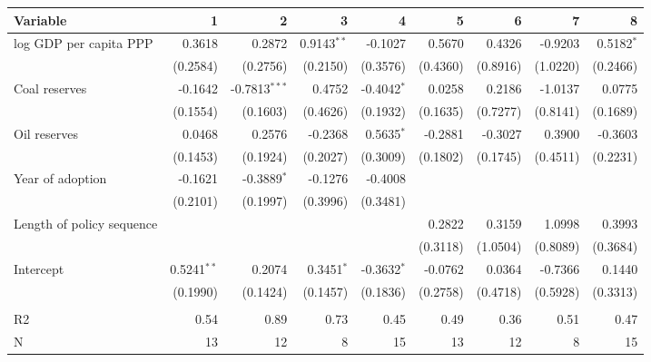 \begin{tabular}{lrrrrrrrr}
\toprule
                  Variable &               1 &                  2 &               3 &              4 &         5 &         6 &         7 &             8 \\
\midrule
    log GDP per capita PPP &          0.3618 &             0.2872 &  0.9143$^{* *}$ &        -0.1027 &    0.5670 &    0.4326 &   -0.9203 &  0.5182$^{*}$ \\
                           &        (0.2584) &           (0.2756) &        (0.2150) &       (0.3576) &  (0.4360) &  (0.8916) &  (1.0220) &      (0.2466) \\
             Coal reserves &         -0.1642 &  -0.7813$^{* * *}$ &          0.4752 &  -0.4042$^{*}$ &    0.0258 &    0.2186 &   -1.0137 &        0.0775 \\
                           &        (0.1554) &           (0.1603) &        (0.4626) &       (0.1932) &  (0.1635) &  (0.7277) &  (0.8141) &      (0.1689) \\
              Oil reserves &          0.0468 &             0.2576 &         -0.2368 &   0.5635$^{*}$ &   -0.2881 &   -0.3027 &    0.3900 &       -0.3603 \\
                           &        (0.1453) &           (0.1924) &        (0.2027) &       (0.3009) &  (0.1802) &  (0.1745) &  (0.4511) &      (0.2231) \\
          Year of adoption &         -0.1621 &      -0.3889$^{*}$ &         -0.1276 &        -0.4008 &           &           &           &               \\
                           &        (0.2101) &           (0.1997) &        (0.3996) &       (0.3481) &           &           &           &               \\
 Length of policy sequence &                 &                    &                 &                &    0.2822 &    0.3159 &    1.0998 &        0.3993 \\
                           &                 &                    &                 &                &  (0.3118) &  (1.0504) &  (0.8089) &      (0.3684) \\
                 Intercept &  0.5241$^{* *}$ &             0.2074 &    0.3451$^{*}$ &  -0.3632$^{*}$ &   -0.0762 &    0.0364 &   -0.7366 &        0.1440 \\
                           &        (0.1990) &           (0.1424) &        (0.1457) &       (0.1836) &  (0.2758) &  (0.4718) &  (0.5928) &      (0.3313) \\
                           &                 &                    &                 &                &           &           &           &               \\
                        R2 &            0.54 &               0.89 &            0.73 &           0.45 &      0.49 &      0.36 &      0.51 &          0.47 \\
                         N &              13 &                 12 &               8 &             15 &        13 &        12 &         8 &            15 \\
\bottomrule
\end{tabular}
